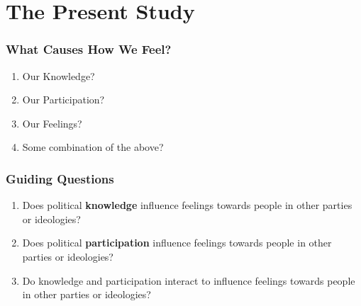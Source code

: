 \documentclass[14pt]{beamer}
\newcommand\tb{\textbf}
\begin{document}
\section{The Present Study}

\begin{frame}
\frametitle{What Causes How We Feel?}
\begin{enumerate}
	\item Our Knowledge?
	\item Our Participation?
	\item Our Feelings?
	\item Some combination of the above?
\end{enumerate}
\end{frame}

\begin{frame}
\frametitle{Guiding Questions}
\begin{enumerate}
	\item Does political \tb{knowledge} influence feelings towards people in other parties or ideologies?
	\item Does political \tb{participation} influence feelings towards people in other parties or ideologies?
	\item Do knowledge and participation interact to influence feelings towards people in other parties or ideologies?
\end{enumerate}
\end{frame}
\end{document}
